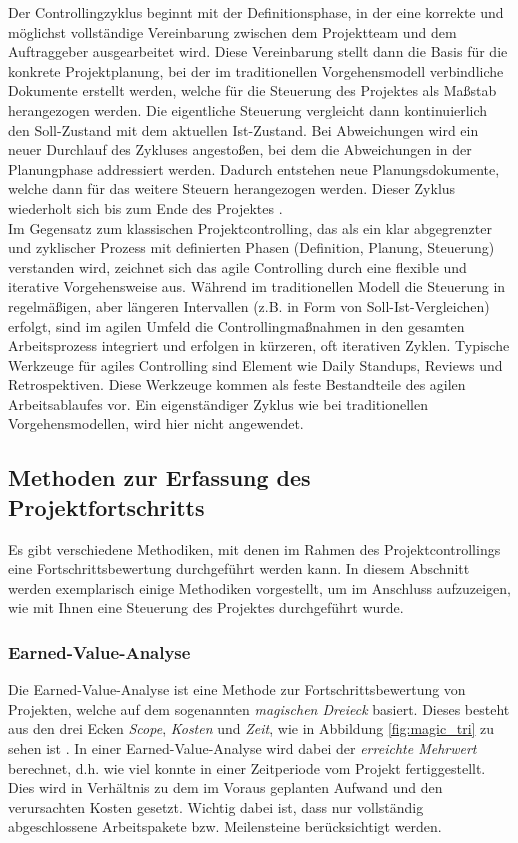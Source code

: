 \documentclass[ThesisDJ.tex]{subfiles}
\begin{document}
    Der Controllingzyklus beginnt mit der Definitionsphase, in der eine korrekte und möglichst vollständige Vereinbarung zwischen dem Projektteam und dem 
    Auftraggeber ausgearbeitet wird. Diese Vereinbarung stellt dann die Basis für die konkrete Projektplanung, bei der im traditionellen Vorgehensmodell
    verbindliche Dokumente erstellt werden, welche für die Steuerung des Projektes als Maßstab herangezogen werden. Die eigentliche Steuerung 
    vergleicht dann kontinuierlich den Soll-Zustand mit dem aktuellen Ist-Zustand. Bei Abweichungen wird ein neuer Durchlauf des Zykluses angestoßen, bei dem die 
    Abweichungen in der Planungphase addressiert werden. Dadurch entstehen neue Planungsdokumente, welche dann für das weitere Steuern herangezogen werden. Dieser Zyklus wiederholt sich 
    bis zum Ende des Projektes \cite[S.~217]{dechange_projektmanagement_2024}. \\

    Im Gegensatz zum klassischen Projektcontrolling, das als ein klar abgegrenzter und zyklischer Prozess mit definierten Phasen (Definition, Planung, Steuerung) verstanden wird, 
    zeichnet sich das agile Controlling durch eine flexible und iterative Vorgehensweise aus. 
    Während im traditionellen Modell die Steuerung in regelmäßigen, aber längeren Intervallen (z.B. in Form von Soll-Ist-Vergleichen) erfolgt,
    sind im agilen Umfeld die Controllingmaßnahmen in den gesamten Arbeitsprozess integriert und erfolgen in kürzeren, oft iterativen Zyklen.
    Typische Werkzeuge für agiles Controlling sind Element wie Daily Standups, Reviews und Retrospektiven. Diese Werkzeuge kommen als feste Bestandteile 
    des agilen Arbeitsablaufes vor. Ein eigenständiger Zyklus wie bei traditionellen Vorgehensmodellen, wird hier nicht angewendet.

    \subsection{Methoden zur Erfassung des Projektfortschritts}
    Es gibt verschiedene Methodiken, mit denen im Rahmen des Projektcontrollings eine Fortschrittsbewertung durchgeführt werden kann.
    In diesem Abschnitt werden exemplarisch einige Methodiken vorgestellt, um im Anschluss aufzuzeigen, wie mit Ihnen eine Steuerung des Projektes durchgeführt 
    wurde.

    \subsubsection{Earned-Value-Analyse}
    Die Earned-Value-Analyse ist eine Methode zur Fortschrittsbewertung von Projekten, welche auf dem sogenannten \emph{magischen Dreieck} basiert. Dieses 
    besteht aus den drei Ecken \emph{Scope}, \emph{Kosten} und \emph{Zeit}, wie in Abbildung \ref{fig:magic_tri} zu sehen ist \cite[S.~84]{kuster_handbuch_2022}.
    In einer Earned-Value-Analyse wird dabei der \emph{erreichte Mehrwert} berechnet, d.h. wie viel konnte 
    in einer Zeitperiode vom Projekt fertiggestellt. Dies wird in Verhältnis zu dem im Voraus geplanten Aufwand und den verursachten Kosten 
    gesetzt. Wichtig dabei ist, dass nur vollständig abgeschlossene Arbeitspakete bzw. Meilensteine berücksichtigt werden.
    
\end{document}
